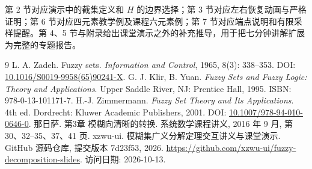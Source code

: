 \documentclass[UTF8,fontset=fandol,zihao=-4,a4paper]{ctexart}
\numberwithin{equation}{section}
\theoremstyle{reportplain}
\begin{document}
第 2 节对应演示中的截集定义和 $H$ 的边界选择；第 3 节对应左右恢复动画与严格证明；第 6 节对应四元素教学例及课程六元素例；第 7 节对应端点说明和有限采样提醒。第 4、5 节与附录给出课堂演示之外的补充推导，用于把七分钟讲解扩展为完整的专题报告。

\begin{thebibliography}{9}
\small
{} L. A. Zadeh. Fuzzy sets. \textit{Information and Control}, 1965, 8(3): 338--353. DOI: \href{https://doi.org/10.1016/S0019-9958(65)90241-X}{10.1016/S0019-9958(65)90241-X}.
 G. J. Klir, B. Yuan. \textit{Fuzzy Sets and Fuzzy Logic: Theory and Applications}. Upper Saddle River, NJ: Prentice Hall, 1995. ISBN: 978-0-13-101171-7.
 H.-J. Zimmermann. \textit{Fuzzy Set Theory and Its Applications}. 4th ed. Dordrecht: Kluwer Academic Publishers, 2001. DOI: \href{https://doi.org/10.1007/978-94-010-0646-0}{10.1007/978-94-010-0646-0}.
 那日萨. 第3章 模糊向清晰的转换. 系统数学课程讲义, 2016 年 9 月, 第 30、32--35、37、41 页.
 xzwu-ui. 模糊集广义分解定理交互讲义与课堂演示. GitHub 源码仓库, 提交版本 7d23f53, 2026. \url{https://github.com/xzwu-ui/fuzzy-decomposition-slides}. 访问日期: 2026-10-13.
\end{thebibliography}
\end{document}

